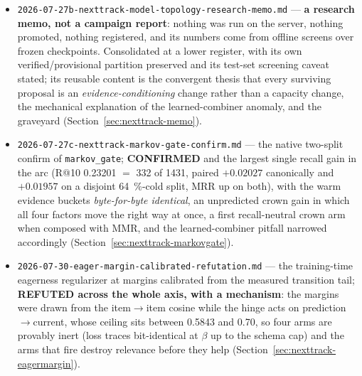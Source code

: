\documentclass[11pt]{article}
\begin{document}
\begin{itemize}
    generation metric for the autoregressive rollout regime (per-axis fade
    calibrated on \num{2135} real train sessions, with the anti-gaming term inside
    the metric), plus five sweeps and \num{240} journeys; \textbf{REFUTED} as a
    model discriminator --- a sixth architecture null, obtained in the deployment
    regime --- with per-seed variance shown to dominate model identity and three
    retracted positives documented as a catalogue of generation-metric pitfalls
    (Section~\ref{sec:nexttrack-rollout}).
  \item \texttt{2026-07-27b-nexttrack-model-topology-research-memo.md} ---
    \textbf{a research memo, not a campaign report}: nothing was run on the
    server, nothing promoted, nothing registered, and its numbers come from
    offline screens over frozen checkpoints. Consolidated at a lower register,
    with its own verified/provisional partition preserved and its test-set
    screening caveat stated; its reusable content is the convergent thesis that
    every surviving proposal is an \emph{evidence-conditioning} change rather than
    a capacity change, the mechanical explanation of the learned-combiner anomaly,
    and the graveyard (Section~\ref{sec:nexttrack-memo}).
  \item \texttt{2026-07-27c-nexttrack-markov-gate-confirm.md} --- the native
    two-split confirm of \texttt{markov\_gate}; \textbf{CONFIRMED} and the largest
    single recall gain in the arc (R@10 \num{0.23201} $=$ \num{332} of \num{1431},
    paired $+\num{0.02027}$ canonically and $+\num{0.01957}$ on a disjoint
    \SI{64}{\percent}-cold split, MRR up on both), with the warm evidence buckets
    \emph{byte-for-byte identical}, an unpredicted crown gain in which all four
    factors move the right way at once, a first recall-neutral crown arm when
    composed with MMR, and the learned-combiner pitfall narrowed accordingly
    (Section~\ref{sec:nexttrack-markovgate}).
  \item \texttt{2026-07-30-eager-margin-calibrated-refutation.md} --- the
    training-time eagerness regularizer at margins calibrated from the measured
    transition tail; \textbf{REFUTED across the whole axis, with a mechanism}: the
    margins were drawn from the item$\to$item cosine while the hinge acts on
    prediction$\to$current, whose ceiling sits between \num{0.5843} and \num{0.70},
    so four arms are provably inert (loss traces bit-identical at $\beta$ up to the
    schema cap) and the arms that fire destroy relevance before they help
    (Section~\ref{sec:nexttrack-eagermargin}).

\end{itemize}
\end{document}
